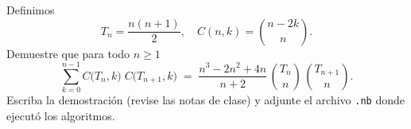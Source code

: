 Definimos
  \[
    T_n = \frac{n(n+1)}{2},
    \quad
    C(n,k) = \binom{n - 2k}{n}.
  \]
  Demuestre que para todo \(n \ge 1\)
  \[
    \sum_{k=0}^{n-1} C\bigl(T_n,k\bigr)\;C\bigl(T_{n+1},k\bigr)
    \;=\;
    \frac{n^3 - 2n^2 + 4n}{n + 2}
    \,\binom{T_n}{n}\,\binom{T_{n+1}}{n}.
  \]
  Escriba la demostración (revise las notas de clase) y adjunte el archivo \texttt{.nb} donde ejecutó los algoritmos.